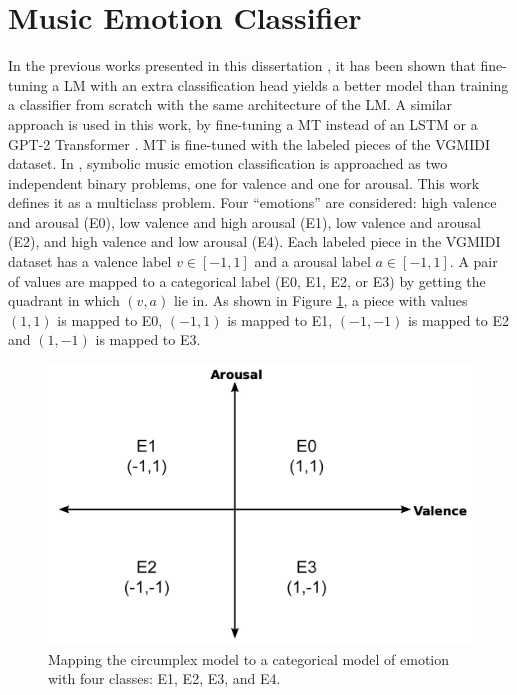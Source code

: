 
\section{Music Emotion Classifier}
\label{sec:emotion_classifier}

In the previous works presented in this dissertation \cite{ferreira_2019, ferreira2020computer}, it has been shown that fine-tuning a LM with an extra classification head yields a better model than training a classifier from scratch with the same architecture of the LM. A similar approach is used in this work, by fine-tuning a MT instead of an LSTM \cite{ferreira_2019} or a GPT-2 Transformer \cite{ferreira2020computer}. MT is fine-tuned with the labeled pieces of the VGMIDI dataset. In \cite{ferreira_2019, ferreira2020computer}, symbolic music emotion classification is approached as two independent binary problems, one for valence and one for arousal. This work defines it as a multiclass problem. Four ``emotions'' are considered: high valence and arousal (E0), low valence and high arousal (E1), low valence and arousal (E2), and high valence and low arousal (E4). Each labeled piece in the VGMIDI dataset has a valence label $v \in [-1, 1]$ and a arousal label $a \in [-1, 1]$. A pair of values are mapped to a categorical label (E0, E1, E2, or E3) by getting the quadrant in which $(v,a)$ lie in. As shown in Figure \ref{fig:va_mapping}, a piece with values $(1,1)$ is mapped to E0, $(-1,1)$ is mapped to E1, $(-1,-1)$ is mapped to E2 and $(1, -1)$ is mapped to E3.

\begin{figure}
 \centering
 \includegraphics[width=0.7\columnwidth]{imgs/ismir21/circumplex.png}
 \caption{Mapping the circumplex model to a categorical model of emotion with four classes: E1, E2, E3, and E4.}
 \label{fig:va_mapping}
\end{figure}

